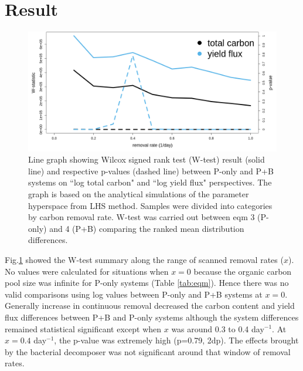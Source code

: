\documentclass[../thesis.tex]{subfiles} %
\begin{document}
\section{Result}
\begin{figure}[H]
    \centering
    \includegraphics[width=\linewidth]{../result/Wilcox.png}
    \caption[Wilcox test summary]{Line graph showing Wilcox signed rank test (W-test) result (solid line) and respective p-values (dashed line) between P-only and P+B systems on ``log total carbon" and ``log yield flux" perspectives.  {\scriptsize The graph is based on the analytical simulations of the parameter hyperspace from LHS method.  Samples were divided into categories by carbon removal rate.  W-test was carried out between eqm 3 (P-only) and 4 (P+B) comparing the ranked mean distribution differences.}}
    \label{fig:wilcox}
\end{figure}

Fig.\ref{fig:wilcox} showed the W-test summary along the range of scanned removal rates ($x$).  No values were calculated for situations when $x=0$ because the organic carbon pool size was infinite for P-only systems (Table \ref{tab:eqm}).  Hence there was no valid comparisons using log values between P-only and P+B systems at $x=0$.  Generally increase in continuous removal decreased the carbon content and yield flux differences between P+B and P-only systems although the system differences remained statistical significant except when $x$ was around 0.3 to 0.4 day$^{-1}$.  At $x=0.4$ day$^{-1}$, the p-value was extremely high (p=0.79, 2dp).  The effects brought by the bacterial decomposer was not significant around that window of removal rates.
\end{document}
